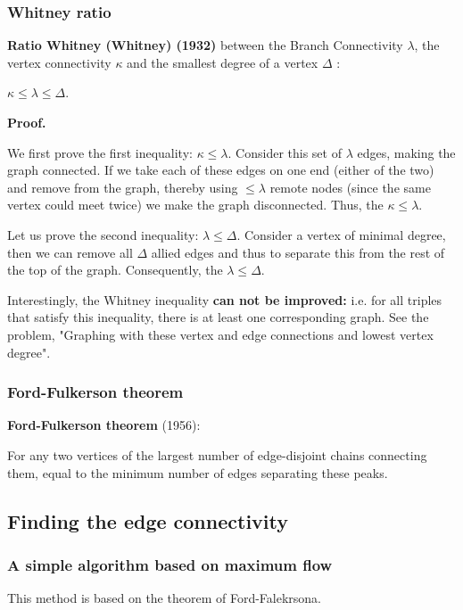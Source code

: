 \subsubsection{ Whitney ratio }

\textbf{Ratio Whitney (Whitney) (1932)} between the Branch Connectivity $\lambda$, the vertex connectivity $\kappa$ and the smallest degree of a vertex $\Delta$ :

$\kappa \le \lambda \le \Delta.$

\textbf{Proof.}

We first prove the first inequality: $\kappa \le \lambda$. Consider this set of $\lambda$ edges, making the graph connected. If we take each of these edges on one end (either of the two) and remove from the graph, thereby using $\le \lambda$ remote nodes (since the same vertex could meet twice) we make the graph disconnected. Thus, the $\kappa \le \lambda$.

Let us prove the second inequality: $\lambda \le \Delta$. Consider a vertex of minimal degree, then we can remove all $\Delta$ allied edges and thus to separate this from the rest of the top of the graph. Consequently, the $\lambda \le \Delta$.

Interestingly, the Whitney inequality \textbf{can not be improved:} i.e. for all triples that satisfy this inequality, there is at least one corresponding graph. See the problem, "Graphing with these vertex and edge connections and lowest vertex degree".

\subsubsection{ Ford-Fulkerson theorem }

\textbf{Ford-Fulkerson theorem} (1956):

For any two vertices of the largest number of edge-disjoint chains connecting them, equal to the minimum number of edges separating these peaks.

\subsection{ Finding the edge connectivity }

\subsubsection{ A simple algorithm based on maximum flow }

This method is based on the theorem of Ford-Falekrsona.

